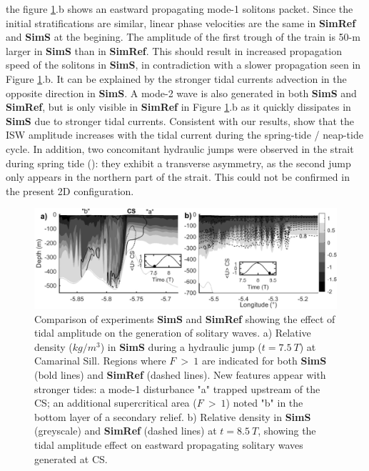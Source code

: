 the figure \ref{fig_cv_spring}.b shows an eastward propagating mode-1 solitons packet. Since the initial stratifications are similar, linear phase velocities are the same in \textbf{SimRef} and \textbf{SimS} at the begining. The amplitude of the first trough of the train is 50-m larger in \textbf{SimS} than in \textbf{SimRef}. This should result in increased propagation speed of the solitons in \textbf{SimS}, in contradiction with a slower propagation seen in Figure \ref{fig_cv_spring}.b. It can be explained by the stronger tidal currents advection in the opposite direction in \textbf{SimS}. A mode-2 wave is also generated in both \textbf{SimS} and \textbf{SimRef}, but is only visible in \textbf{SimRef} in Figure \ref{fig_cv_spring}.b as it quickly dissipates in \textbf{SimS} due to stronger tidal currents.
Consistent with our results, \citet{FA1988} show that the ISW amplitude increases with the tidal current during the spring-tide / neap-tide cycle. In addition,  two concomitant hydraulic jumps were observed in the strait during spring tide (\citep{SG2011}): they exhibit a transverse asymmetry, as the second jump only appears in the northern part of the strait. This could not be confirmed in the present 2D configuration.

\begin{figure}[!h]
  \centering
  \includegraphics[width=1\textwidth]{./GBR2D/figure10.png}
  \caption{Comparison of experiments \textbf{SimS} and \textbf{SimRef} showing the effect of tidal amplitude on the generation of solitary waves. a) Relative density ($kg/m^3$) in \textbf{SimS} during a hydraulic jump ($t = 7.5\ T$) at Camarinal Sill. Regions where $F\ >\ 1$ are indicated for both \textbf{SimS} (bold lines) and \textbf{SimRef} (dashed lines). New features appear with stronger tides: a mode-1 disturbance "a" trapped upstream of the CS; an additional supercritical area ($F\ >\ 1$) noted "b" in the bottom layer of a secondary relief. b) Relative density in \textbf{SimS} (greyscale) and \textbf{SimRef} (dashed lines) at $t = 8.5\ T$, showing the tidal amplitude effect on eastward propagating solitary waves generated at CS.}
  \label{fig_cv_spring}
\end{figure}


